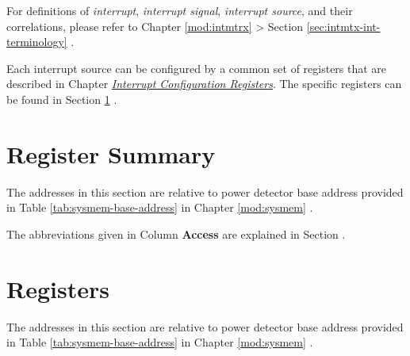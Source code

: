 \documentclass[main\_\_EN.tex]{subfiles}
\begin{document}
\begin{tiplisting}
For definitions of \textit{interrupt}, \textit{interrupt signal}, \textit{interrupt source}, and their correlations, please refer to Chapter \ref{mod:intmtrx} \textit{} > Section \ref{sec:intmtx-int-terminology} \textit{}.
\end{tiplisting}

Each interrupt source can be configured by a common set of registers that are described in Chapter \hyperref[interrupt-config-registers]{\textit{Interrupt Configuration Registers}}. The specific registers can be found in Section \ref{sec:psdet-reg-summ} \textit{}.





\newpage
\hypertarget{psdet-reg-summ}{}
\section{Register Summary}
\label{sec:psdet-reg-summ}

The addresses in this section are relative to power detector base address provided in Table \ref{tab:sysmem-base-address} in Chapter \ref{mod:sysmem} \textit{}.

The abbreviations given in Column \textbf{Access} are explained in Section .






\newpage
\section{Registers}

The addresses in this section are relative to power detector base address provided in Table \ref{tab:sysmem-base-address} in Chapter \ref{mod:sysmem} \textit{}.


\end{document}
